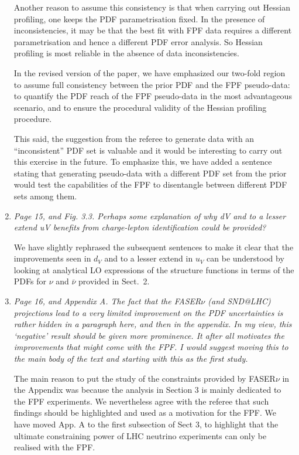 \documentclass[11pt,a4paper]{article}
\begin{document}
\begin{enumerate}
          Another reason to assume this consistency  is that when carrying out Hessian profiling,
          one keeps the PDF parametrisation fixed. In the presence of inconsistencies, it may be
          that the best fit with FPF data requires a different parametrisation and hence
          a different PDF error analysis.
          So Hessian profiling is most reliable in the absence of data inconsistencies.

          In the revised version of the paper, we have emphasized our two-fold region
          to assume full consistency between the prior PDF and the FPF pseudo-data: to
          quantify the PDF reach of the FPF pseudo-data in the most advantageous scenario,
          and to ensure the procedural validity of the Hessian profiling procedure.

          This said, the suggestion from the referee to generate data with an ``inconsistent'' PDF
          set is valuable and it would be interesting to carry out this exercise in the future.
          To emphasize this, we have added a sentence stating that generating pseudo-data with a different
          PDF set from the prior would test the capabilities of the FPF to disentangle between
          different PDF sets among them.
          
	\item {\it Page 15, and Fig. 3.3. Perhaps some explanation of why dV and to a lesser extend uV
		benefits from charge-lepton identification could be provided?
	}
	
	We have slightly rephrased the subsequent sentences to make it clear that the improvements
	seen in $d_V$ and to a lesser extend in $u_V$ can be understood by looking at analytical 
	LO expressions of the structure functions in terms of the PDFs for $\nu$ and $\bar{\nu}$
        provided in Sect.~2.
	
	\item {\it Page 16, and Appendix A. The fact that the FASER$\nu$ (and SND@LHC) projections lead
		to a very limited improvement on the PDF uncertainties is rather hidden in a paragraph
		here, and then in the appendix. In my view, this ‘negative’ result should be given more
		prominence. It after all motivates the improvements that might come with the FPF. I
		would suggest moving this to the main body of the text and starting with this as the
		first study.
	}
	
	The main reason to put the study of the constraints provided by FASER$\nu$ in the Appendix was because
	the analysis in Section 3 is mainly dedicated to the FPF experiments. We nevertheless agree with the
	referee that such findings should be highlighted and used as a motivation for the FPF.
        We have moved App. A to the first subsection of Sect 3, to highlight that the ultimate
        constraining power of LHC neutrino experiments can only be realised with the FPF.
        

\end{enumerate}
\end{document}
